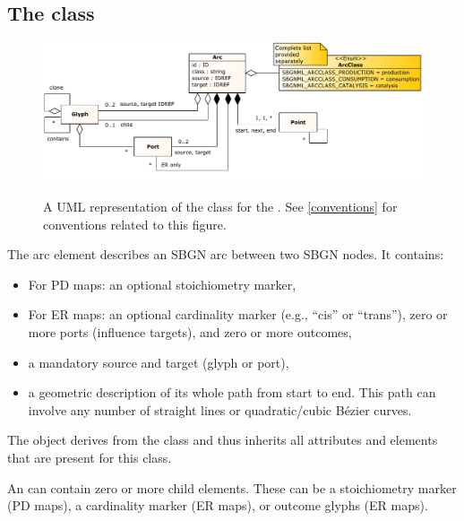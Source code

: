 \subsection{The  class}
\label{arc-class}

\begin{figure}[ht!]
  \centering
  \includegraphics[width=\textwidth]{figures/sbgnml_arc_uml.pdf}\\
\caption{A UML representation of the \Arc class for the \SbgnmlPackage.
See \ref{conventions} for conventions related to this figure. }
  \label{fig:sbgnml_arc_uml}
\end{figure}


The arc element describes an SBGN arc between two SBGN nodes. It contains:

\begin{itemize}
	\item{For PD maps: an optional stoichiometry marker,}

\item {For ER maps: an optional cardinality marker (e.g., ``cis'' or ``trans''), zero or more ports (influence targets), and zero or more outcomes,}
\item {a mandatory source and target (glyph or port),}
\item {a geometric description of its whole path from start to end. This path can involve any number of straight lines or quadratic/cubic B\'{e}zier curves.}

\end{itemize}



The \Arc object derives from the \SbgnBase class and thus inherits all
attributes and elements that are present for this class.

An \Arc can contain zero or more child \Glyph elements. These can be a stoichiometry marker (PD maps), a cardinality marker (ER maps), or outcome glyphs (ER maps). 


